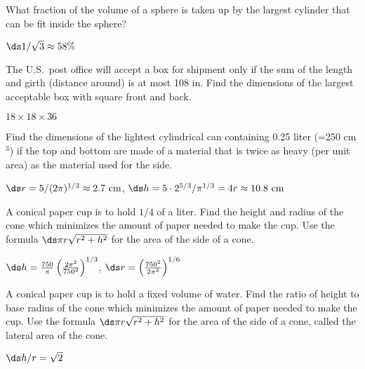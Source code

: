 \begin{exercises}
\begin{exercise}
What fraction of the volume of a sphere is taken up by the largest cylinder
that can be fit inside the sphere?
\begin{answer} $\ds 1/\sqrt3\approx 58\%$
\end{answer}\end{exercise}

\begin{exercise}
The U.S.~post office will accept a box for shipment only if the sum of the
length and girth (distance around) is at most 108 in.  Find the dimensions
of the largest acceptable box with square front and back.
\begin{answer} $18\times18\times36$
\end{answer}\end{exercise}

\begin{exercise}
Find the dimensions of the lightest cylindrical can containing 0.25 liter
(=250 cm${}^3$) if the top and bottom are made of a material that is twice
as heavy (per unit area) as the material used for the side.
\begin{answer} $\ds r=5/(2\pi)^{1/3}\approx 2.7\hbox{ cm}$,\hfill\break
$\ds h=5\cdot2^{5/3}/\pi^{1/3}=4r\approx 10.8 \hbox{ cm}$
\end{answer}\end{exercise}

\begin{exercise} A conical paper cup is to hold $1/4$ of a liter. Find the
height and radius of the cone which minimizes
the amount of paper needed to make the cup.  Use the formula $\ds \pi
r\sqrt{r^2+h^2}$ for the area of the side of a cone.
\begin{answer} $\ds h={750\over\pi}\left({2\pi^2\over 750^2}\right)^{1/3}$, 
$\ds r=\left({750^2\over 2\pi^2}\right)^{1/6}$
\end{answer}\end{exercise}

\begin{exercise} A conical paper cup is to hold a fixed volume of water.
Find the ratio of height to base radius of the cone which minimizes
the amount of paper needed to make the cup.  Use the formula $\ds \pi
r\sqrt{r^2+h^2}$ for the area of the side of a cone, called the
{\dfont lateral area\/} of the cone.
\begin{answer} $\ds h/r=\sqrt2$
\end{answer}\end{exercise}


\end{exercises}
